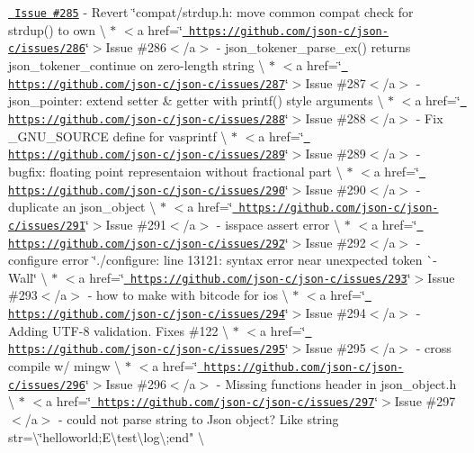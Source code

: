\begin{DoxyItemize}
\item \href{https://github.com/json-c/json-c/issues/285}{\texttt{ Issue \#285}} -\/ Revert \char`\"{}compat/strdup.\+h\+: move common compat check for strdup() to own \textbackslash{} $\ast$ $<$a href=\char`\"{}\href{https://github.com/json-c/json-c/issues/286}{\texttt{ https\+://github.\+com/json-\/c/json-\/c/issues/286}}\char`\"{}$>$\+Issue \#286$<$/a$>$ -\/ json\+\_\+tokener\+\_\+parse\+\_\+ex() returns json\+\_\+tokener\+\_\+continue on zero-\/length string \textbackslash{} $\ast$ $<$a href=\char`\"{}\href{https://github.com/json-c/json-c/issues/287}{\texttt{ https\+://github.\+com/json-\/c/json-\/c/issues/287}}\char`\"{}$>$\+Issue \#287$<$/a$>$ -\/ json\+\_\+pointer\+: extend setter \& getter with printf() style arguments \textbackslash{} $\ast$ $<$a href=\char`\"{}\href{https://github.com/json-c/json-c/issues/288}{\texttt{ https\+://github.\+com/json-\/c/json-\/c/issues/288}}\char`\"{}$>$\+Issue \#288$<$/a$>$ -\/ Fix \+\_\+\+GNU\+\_\+\+SOURCE define for vasprintf \textbackslash{} $\ast$ $<$a href=\char`\"{}\href{https://github.com/json-c/json-c/issues/289}{\texttt{ https\+://github.\+com/json-\/c/json-\/c/issues/289}}\char`\"{}$>$\+Issue \#289$<$/a$>$ -\/ bugfix\+: floating point representaion without fractional part \textbackslash{} $\ast$ $<$a href=\char`\"{}\href{https://github.com/json-c/json-c/issues/290}{\texttt{ https\+://github.\+com/json-\/c/json-\/c/issues/290}}\char`\"{}$>$\+Issue \#290$<$/a$>$ -\/ duplicate an json\+\_\+object \textbackslash{} $\ast$ $<$a href=\char`\"{}\href{https://github.com/json-c/json-c/issues/291}{\texttt{ https\+://github.\+com/json-\/c/json-\/c/issues/291}}\char`\"{}$>$\+Issue \#291$<$/a$>$ -\/ isspace assert error \textbackslash{} $\ast$ $<$a href=\char`\"{}\href{https://github.com/json-c/json-c/issues/292}{\texttt{ https\+://github.\+com/json-\/c/json-\/c/issues/292}}\char`\"{}$>$\+Issue \#292$<$/a$>$ -\/ configure error  \char`\"{}./configure\+: line 13121\+: syntax error near unexpected token \`{}-\/\+Wall\textquotesingle{}\char`\"{} \textbackslash{} $\ast$ $<$a href=\char`\"{}\href{https://github.com/json-c/json-c/issues/293}{\texttt{ https\+://github.\+com/json-\/c/json-\/c/issues/293}}\char`\"{}$>$\+Issue \#293$<$/a$>$ -\/ how to make with bitcode for ios \textbackslash{} $\ast$ $<$a href=\char`\"{}\href{https://github.com/json-c/json-c/issues/294}{\texttt{ https\+://github.\+com/json-\/c/json-\/c/issues/294}}\char`\"{}$>$\+Issue \#294$<$/a$>$ -\/ Adding UTF-\/8 validation.  Fixes \#122 \textbackslash{} $\ast$ $<$a href=\char`\"{}\href{https://github.com/json-c/json-c/issues/295}{\texttt{ https\+://github.\+com/json-\/c/json-\/c/issues/295}}\char`\"{}$>$\+Issue \#295$<$/a$>$ -\/ cross compile w/ mingw \textbackslash{} $\ast$ $<$a href=\char`\"{}\href{https://github.com/json-c/json-c/issues/296}{\texttt{ https\+://github.\+com/json-\/c/json-\/c/issues/296}}\char`\"{}$>$\+Issue \#296$<$/a$>$ -\/ Missing functions header in json\+\_\+object.\+h \textbackslash{} $\ast$ $<$a href=\char`\"{}\href{https://github.com/json-c/json-c/issues/297}{\texttt{ https\+://github.\+com/json-\/c/json-\/c/issues/297}}\char`\"{}$>$\+Issue \#297$<$/a$>$ -\/ could not parse string to Json object? Like string str=\textbackslash{}\char`\"{}helloworld;E\textbackslash{}test\textbackslash{}log\textbackslash{};end"{} \textbackslash{}

\end{DoxyItemize}
